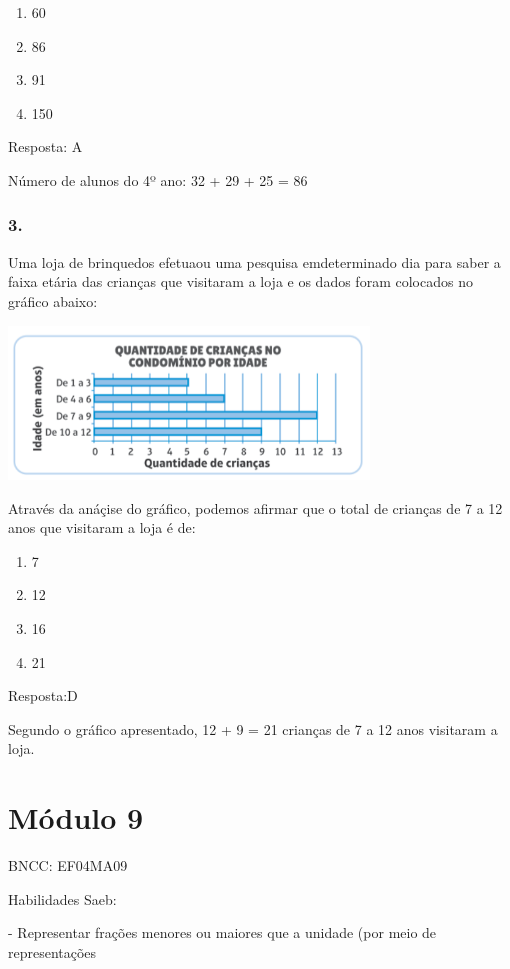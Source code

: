 \begin{enumerate}
\def\labelenumi{\alph{enumi})}
\item
  60
\item
  86
\item
  91
\item
  150
\end{enumerate}

Resposta: A

Número de alunos do 4º ano: 32 + 29 + 25 = 86

\subsubsection{3.}\label{section-103}

Uma loja de brinquedos efetuaou uma pesquisa emdeterminado dia para
saber a faixa etária das crianças que visitaram a loja e os dados foram
colocados no gráfico abaixo:

\includegraphics[width=3.77564in,height=1.60972in]{media/image105.png}

Através da anáçise do gráfico, podemos afirmar que o total de crianças
de 7 a 12 anos que visitaram a loja é de:

\begin{enumerate}
\def\labelenumi{\alph{enumi})}
\item
  7
\item
  12
\item
  16
\item
  21
\end{enumerate}

Resposta:D

Segundo o gráfico apresentado, 12 + 9 = 21 crianças de 7 a 12 anos
visitaram a loja.

\section{Módulo 9}\label{muxf3dulo-9}

BNCC: EF04MA09

Habilidades Saeb:

- Representar frações menores ou maiores que a unidade (por meio de
representações

